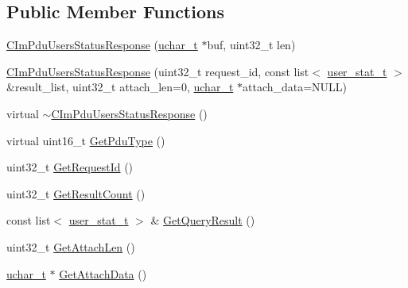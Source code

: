 \subsection*{Public Member Functions}
\begin{DoxyCompactItemize}
\item 
\hyperlink{class_c_im_pdu_users_status_response_ab42d074c1ea2d74d7ac0c47f2ae64494}{C\+Im\+Pdu\+Users\+Status\+Response} (\hyperlink{base_2ostype_8h_a124ea0f8f4a23a0a286b5582137f0b8d}{uchar\+\_\+t} $\ast$buf, uint32\+\_\+t len)
\item 
\hyperlink{class_c_im_pdu_users_status_response_a0df5cf9dfcd75b22568ab78467fc1ced}{C\+Im\+Pdu\+Users\+Status\+Response} (uint32\+\_\+t request\+\_\+id, const list$<$ \hyperlink{structuser__stat__t}{user\+\_\+stat\+\_\+t} $>$ \&result\+\_\+list, uint32\+\_\+t attach\+\_\+len=0, \hyperlink{base_2ostype_8h_a124ea0f8f4a23a0a286b5582137f0b8d}{uchar\+\_\+t} $\ast$attach\+\_\+data=N\+U\+L\+L)
\item 
virtual \hyperlink{class_c_im_pdu_users_status_response_a07f4274ea4b2fda105c1f2fbd93399e0}{$\sim$\+C\+Im\+Pdu\+Users\+Status\+Response} ()
\item 
virtual uint16\+\_\+t \hyperlink{class_c_im_pdu_users_status_response_aa6656156095cc3563637aa3e6a00800a}{Get\+Pdu\+Type} ()
\item 
uint32\+\_\+t \hyperlink{class_c_im_pdu_users_status_response_a5d51df4b8d32e5e1a4e10e2db53d5081}{Get\+Request\+Id} ()
\item 
uint32\+\_\+t \hyperlink{class_c_im_pdu_users_status_response_aced5696daa160ed53dbc4f554ae4e0a6}{Get\+Result\+Count} ()
\item 
const list$<$ \hyperlink{structuser__stat__t}{user\+\_\+stat\+\_\+t} $>$ \& \hyperlink{class_c_im_pdu_users_status_response_a2ac0e1cbf7008ebb488f2c53128a3dcf}{Get\+Query\+Result} ()
\item 
uint32\+\_\+t \hyperlink{class_c_im_pdu_users_status_response_ae52f832f2fa47463607fcbcd2733adc9}{Get\+Attach\+Len} ()
\item 
\hyperlink{base_2ostype_8h_a124ea0f8f4a23a0a286b5582137f0b8d}{uchar\+\_\+t} $\ast$ \hyperlink{class_c_im_pdu_users_status_response_adc12afc1896c7c4537d1a768997cf8a3}{Get\+Attach\+Data} ()
\end{DoxyCompactItemize}
